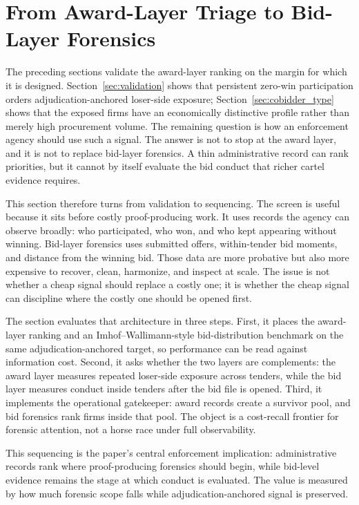 \section{From Award-Layer Triage to Bid-Layer Forensics}
\label{sec:screening_forensics}

The preceding sections validate the award-layer ranking on the
margin for which it is designed. Section~\ref{sec:validation}
shows that persistent zero-win participation orders
adjudication-anchored loser-side exposure; Section~\ref{sec:cobidder_type}
shows that the exposed firms have an economically distinctive
profile rather than merely high procurement volume. The remaining
question is how an enforcement agency should use such a signal.
The answer is not to stop at the award layer, and it is not to
replace bid-layer forensics. A thin administrative record can
rank priorities, but it cannot by itself evaluate the bid conduct
that richer cartel evidence requires.

This section therefore turns from validation to sequencing. The
screen is useful because it sits before costly proof-producing
work. It uses records the agency can observe broadly: who
participated, who won, and who kept appearing without winning.
Bid-layer forensics uses submitted offers, within-tender bid
moments, and distance from the winning bid. Those data are more
probative but also more expensive to recover, clean, harmonize,
and inspect at scale. The issue is not whether a cheap signal
should replace a costly one; it is whether the cheap signal can
discipline where the costly one should be opened first.

The section evaluates that architecture in three steps. First, it
places the award-layer ranking and an Imhof--Wallimann-style
bid-distribution benchmark on the same adjudication-anchored
target, so performance can be read against information cost.
Second, it asks whether the two layers are complements: the award
layer measures repeated loser-side exposure across tenders, while
the bid layer measures conduct inside tenders after the bid file
is opened. Third, it implements the operational gatekeeper:
award records create a survivor pool, and bid forensics rank
firms inside that pool. The object is a cost-recall frontier for
forensic attention, not a horse race under full observability.

This sequencing is the paper's central enforcement implication:
administrative records rank where proof-producing forensics
should begin, while bid-level evidence remains the stage at
which conduct is evaluated. The value is measured by how much
forensic scope falls while adjudication-anchored signal is
preserved.

